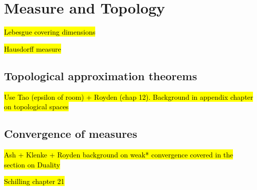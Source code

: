 
\chapter{Measure and Topology\label{chap:measureAndTopology}}

\hl{Lebesgue covering dimensions}

\hl{Hausdorff measure}

\section{Topological approximation theorems}

\hl{Use Tao (epsilon of room) + Royden (chap 12). Background in appendix chapter on topological spaces}

\section{Convergence of measures}

\hl{Ash + Klenke + Royden background on weak* convergence covered in the section on Duality}

\hl{Schilling chapter 21}
